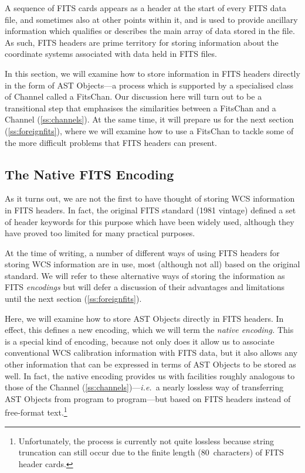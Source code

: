 \documentclass[twoside,11pt]{article}
\newcommand{\htmlref}[2]{#1}
\newcommand{\secref}[1]{\S\ref{#1}}
\renewcommand{\secref}[1]{\ref{#1}}
\begin{document}
A sequence of FITS cards appears as a header at the start of every
FITS data file, and sometimes also at other points within it, and is
used to provide ancillary information which qualifies or describes the
main array of data stored in the file. As such, FITS headers are prime
territory for storing information about the coordinate systems
associated with data held in FITS files.

In this section, we will examine how to store information in FITS
headers directly in the form of AST Objects---a process which is
supported by a specialised class of \htmlref{Channel}{Channel} called a \htmlref{FitsChan}{FitsChan}. Our
discussion here will turn out to be a transitional step that
emphasises the similarities between a FitsChan and a Channel
(\secref{ss:channels}). At the same time, it will prepare us for the
next section (\secref{ss:foreignfits}), where we will examine how to
use a FitsChan to tackle some of the more difficult problems that FITS
headers can present.

\subsection{\label{ss:nativeencoding}The Native FITS Encoding}

As it turns out, we are not the first to have thought of storing WCS
information in FITS headers. In fact, the original FITS standard (1981
vintage) defined a set of header keywords for this purpose which have
been widely used, although they have proved too limited for many
practical purposes.

At the time of writing, a number of different ways of using FITS
headers for storing WCS information are in use, most (although not
all) based on the original standard. We will refer to these
alternative ways of storing the information as FITS {\em{encodings}}
but will defer a discussion of their advantages and limitations until
the next section (\secref{ss:foreignfits}).

Here, we will examine how to store AST Objects directly in FITS
headers. In effect, this defines a new encoding, which we will term
the {\em{native encoding.}} This is a special kind of encoding,
because not only does it allow us to associate conventional
WCS calibration information with FITS data, but it also allows any other
information that can be expressed in terms of AST Objects to be stored
as well.  In fact, the native encoding provides us with facilities
roughly analogous to those of the \htmlref{Channel}{Channel}
(\secref{ss:channels})---{\em{i.e.}}\ a nearly lossless way of
transferring AST Objects from program to program---but based on FITS
headers instead of free-format text.\footnote{Unfortunately, the
process is currently not quite lossless because string truncation can
still occur due to the finite length (80~characters) of FITS header
cards.}
\end{document}

